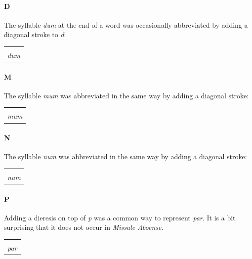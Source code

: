 \documentclass[a4paper, 12pt]{article}
\newcommand{\sample}[1]{{\mstexturafamily\fontsize{18}{18}\selectfont #1}}
\begin{document}
\paragraph{D} The syllable \emph{dum} at the end of a word was
occasionally abbreviated by adding a diagonal stroke to \emph{d}:

\begin{center}
  \begin{tabular}{c}
    \sample{\msabbra{dum}} \\
    \emph{dum}
  \end{tabular}
\end{center}


\paragraph{M} The syllable \emph{mum} was abbreviated in the same way
by adding a diagonal stroke:

\begin{center}
  \begin{tabular}{c}
    \sample{\msabbra{mum}} \\
    \emph{mum}
  \end{tabular}
\end{center}


\paragraph{N} The syllable \emph{num} was abbreviated in the same way
by adding a diagonal stroke:

\begin{center}
  \begin{tabular}{c}
    \sample{\msabbra{num}} \\
    \emph{num}
  \end{tabular}
\end{center}


\paragraph{P} Adding a dieresis on top of \emph{p} was a common way to
represent \emph{par}. It is a bit surprising that it does not occur in
\emph{Missale Aboense}. 

\begin{center}
  \begin{tabular}{c}
    \sample{\msabbra{par}} \\
    \emph{par}
  \end{tabular}
\end{center}
\end{document}
